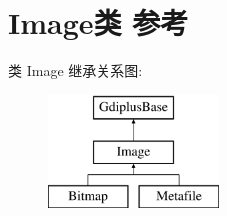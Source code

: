 \hypertarget{class_image}{}\section{Image类 参考}
\label{class_image}
类 Image 继承关系图\+:\begin{figure}[H]
\begin{center}
\leavevmode
\includegraphics[height=3.000000cm]{class_image}
\end{center}
\end{figure}
